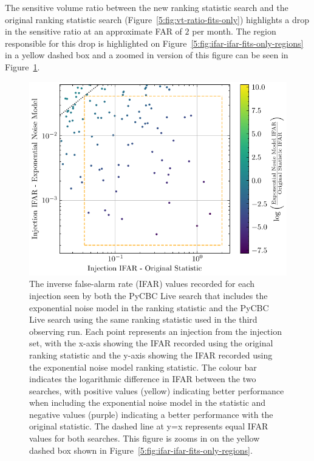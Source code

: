 The sensitive volume ratio between the new ranking statistic search and the original ranking statistic search (Figure~\ref{5:fig:vt-ratio-fits-only}) highlights a drop in the sensitive ratio at an approximate FAR of $2$ per month. The region responsible for this drop is highlighted on Figure~\ref{5:fig:ifar-ifar-fits-only-regions} in a yellow dashed box and a zoomed in version of this figure can be seen in Figure~\ref{5:fig:bottom-left-region}.
%
\begin{figure}
    \centering
    \includegraphics[width=1\textwidth]{images/5_pycbclive/plots/fits_only_ifar_vs_ifar_bottom_left_region.pdf}
    \caption{The inverse false-alarm rate (IFAR) values recorded for each injection seen by both the PyCBC Live search that includes the exponential noise model in the ranking statistic and the PyCBC Live search using the same ranking statistic used in the third observing run. Each point represents an injection from the injection set, with the x-axis showing the IFAR recorded using the original ranking statistic and the y-axis showing the IFAR recorded using the exponential noise model ranking statistic. The colour bar indicates the logarithmic difference in IFAR between the two searches, with positive values (yellow) indicating better performance when including the exponential noise model in the statistic and negative values (purple) indicating a better performance with the original statistic. The dashed line at y=x represents equal IFAR values for both searches. This figure is zooms in on the yellow dashed box shown in Figure~\ref{5:fig:ifar-ifar-fits-only-regions}.}
    \label{5:fig:bottom-left-region}
\end{figure}
